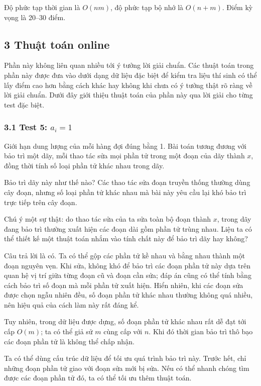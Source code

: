 \documentclass[11pt]{article}
\begin{document}
Độ phức tạp thời gian là \(O(nm)\), độ phức tạp bộ nhớ là \(O(n+m)\). Điểm kỳ
vọng là 20--30 điểm.

\subsection*{3 Thuật toán online}

Phần này không liên quan nhiều tới ý tưởng lời giải chuẩn. Các thuật toán trong
phần này được đưa vào dưới dạng dữ liệu đặc biệt để kiểm tra liệu thí sinh có
thể lấy điểm cao hơn bằng cách khác hay không khi chưa có ý tưởng thật rõ ràng
về lời giải chuẩn. Dưới đây giới thiệu thuật toán của phần này qua lời giải cho
từng test đặc biệt.

\subsubsection*{3.1 Test 5: \(a_i=1\)}

Giới hạn dung lượng của mỗi hàng đợi đúng bằng 1. Bài toán tương đương với bảo
trì một dãy, mỗi thao tác sửa mọi phần tử trong một đoạn của dãy thành \(x\),
đồng thời tính số loại phần tử khác nhau trong dãy.

Bảo trì dãy này như thế nào? Các thao tác sửa đoạn truyền thống thường dùng cây
đoạn, nhưng số loại phần tử khác nhau mà bài này yêu cầu lại khó bảo trì trực
tiếp trên cây đoạn.

Chú ý một sự thật: do thao tác sửa của ta sửa toàn bộ đoạn thành \(x\), trong
dãy đang bảo trì thường xuất hiện các đoạn dài gồm phần tử trùng nhau. Liệu ta
có thể thiết kế một thuật toán nhắm vào tính chất này để bảo trì dãy hay không?

Câu trả lời là có. Ta có thể gộp các phần tử kề nhau và bằng nhau thành một đoạn
nguyên vẹn. Khi sửa, không khó để bảo trì các đoạn phần tử này dựa trên quan hệ
vị trí giữa từng đoạn cũ và đoạn cần sửa; đáp án cũng có thể tính bằng cách bảo
trì số đoạn mà mỗi phần tử xuất hiện. Hiển nhiên, khi các đoạn sửa được chọn
ngẫu nhiên đều, số đoạn phần tử khác nhau thường không quá nhiều, nên hiệu quả
của cách làm này rất đáng kể.

Tuy nhiên, trong dữ liệu được dựng, số đoạn phần tử khác nhau rất dễ đạt tới cấp
\(O(m)\); ta có thể giả sử \(m\) cùng cấp với \(n\). Khi đó thời gian bảo trì
thô bạo các đoạn phần tử là không thể chấp nhận.

Ta có thể dùng cấu trúc dữ liệu để tối ưu quá trình bảo trì này. Trước hết, chỉ
những đoạn phần tử giao với đoạn sửa mới bị sửa. Nếu có thể nhanh chóng tìm được
các đoạn phần tử đó, ta có thể tối ưu thêm thuật toán.
\end{document}
